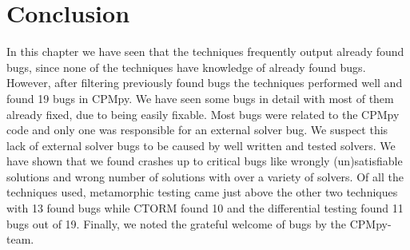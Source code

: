 

\section{Conclusion}
\label{res:conclusion}
In this chapter we have seen that the techniques frequently output already found bugs, since none of the techniques have knowledge of already found bugs. However, after filtering previously found bugs the techniques performed well and found 19 bugs in CPMpy. 
We have seen some bugs in detail with most of them already fixed, due to being easily fixable. Most bugs were related to the CPMpy code and only one was responsible for an external solver bug. We suspect this lack of external solver bugs to be caused by well written and tested solvers. We have shown that we found crashes up to critical bugs like wrongly (un)satisfiable solutions and wrong number of solutions with over a variety of solvers. Of all the techniques used, metamorphic testing came just above the other two techniques with 13 found bugs while CTORM found 10 and the differential testing found 11 bugs out of 19. Finally, we noted the grateful welcome of bugs by the CPMpy-team.

